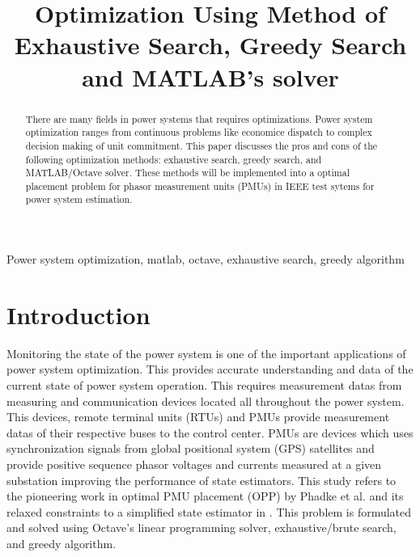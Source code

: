 \documentclass[conference]{IEEEtran}
\begin{document}
	
\title{Optimization Using Method of Exhaustive Search, Greedy Search and MATLAB's solver}
	
\author{
}
	
\maketitle

\begin{abstract}
	There are many fields in power systems that requires optimizations. Power system optimization ranges from continuous problems like economice dispatch to complex decision making of unit commitment. This paper discusses the pros and cons of the following optimization methods: exhaustive search, greedy search, and MATLAB/Octave solver. These methods will be implemented into a optimal placement problem for phasor measurement units (PMUs) in IEEE test sytems for power system estimation.
\end{abstract}

\begin{IEEEkeywords}
	Power system optimization, matlab, octave, exhaustive search, greedy algorithm
\end{IEEEkeywords}

\section{Introduction}
Monitoring the state of the power system is one of the important applications of power system optimization. This provides accurate understanding and data of the current state of power system operation. This requires measurement datas from measuring and communication devices located all throughout the power system. This devices, remote terminal units (RTUs) and PMUs provide measurement datas of their respective buses to the control center. PMUs are devices which uses synchronization signals from global positional system (GPS) satellites and provide positive sequence phasor voltages and currents measured at a given substation improving the performance of state estimators. This study refers to the pioneering work in optimal PMU placement (OPP) by Phadke et al. \cite{Phadke1986,Phadke1993} and its relaxed constraints to a simplified state estimator in \cite{Baldwin1993}. This problem is formulated and solved using Octave's linear programming solver, exhaustive/brute search, and greedy algorithm.
\end{document}
